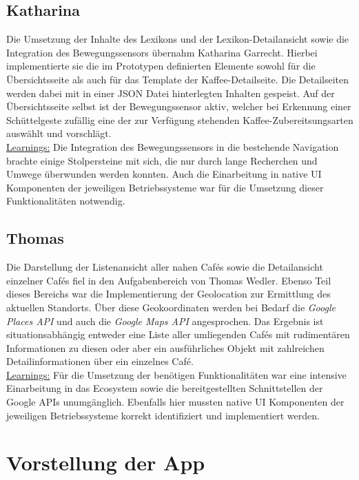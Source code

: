 \subsection{Katharina}
Die Umsetzung der Inhalte des Lexikons und der Lexikon-Detailansicht sowie die Integration des Bewegungssensors übernahm Katharina Garrecht.
Hierbei implementierte sie die im Prototypen definierten Elemente sowohl für die Übersichtsseite als auch für das Template der Kaffee-Detailseite.
Die Detailseiten werden dabei mit in einer JSON Datei hinterlegten Inhalten gespeist.
Auf der Übersichtsseite selbst ist der Bewegungssensor aktiv, welcher bei Erkennung einer Schüttelgeste zufällig eine der zur Verfügung stehenden Kaffee-Zubereitsungsarten auswählt und vorschlägt.
\\
\underline{Learnings:}
Die Integration des Bewegungssensors in die bestehende Navigation brachte einige Stolpersteine mit sich, die nur durch lange Recherchen und Umwege überwunden werden konnten.
Auch die Einarbeitung in native UI Komponenten der jeweiligen Betriebssysteme war für die Umsetzung dieser Funktionalitäten notwendig.

\subsection{Thomas}
Die Darstellung der Listenansicht aller nahen Cafés sowie die Detailansicht einzelner Cafés fiel in den Aufgabenbereich von Thomas Wedler.
Ebenso Teil dieses Bereichs war die Implementierung der Geolocation zur Ermittlung des aktuellen Standorts.
Über diese Geokoordinaten werden bei Bedarf die \emph{Google Places API} und auch die \emph{Google Maps API} angesprochen.
Das Ergebnis ist situationsabhängig entweder eine Liste aller umliegenden Cafés mit rudimentären Informationen zu diesen oder aber ein ausführliches Objekt mit zahlreichen Detailinformationen über ein einzelnes Café.
\\
\underline{Learnings:}
Für die Umsetzung der benötigen Funktionalitäten war eine intensive Einarbeitung in das Ecosystem sowie die bereitgestellten Schnittstellen der Google APIs unumgänglich.
Ebenfalls hier mussten native UI Komponenten der jeweiligen Betriebssysteme korrekt identifiziert und implementiert werden.

\newpage

\section{Vorstellung der App}
\nopagebreak

